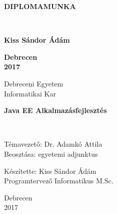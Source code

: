 \documentclass[hidelinks, 12pt, a4paper]{report}
\begin{document}
\begin{titlepage}
\pagestyle{empty}

\vspace*{4cm}

\begin{center}
\vfill
\begin{minipage}{\linewidth}
\centering
\begin{spacing}{2.5}
{ \huge \bfseries DIPLOMAMUNKA }
\end{spacing}
\end{minipage}
\\[10cm]

\begin{minipage}{1.0\textwidth}
\begin{flushright} \Large \bfseries
Kiss Sándor Ádám
\end{flushright}
\end{minipage}

\vfill

{\Large \bfseries Debrecen \\ 2017}

\end{center}
\end{titlepage}

\begin{titlepage}
\pagestyle{empty}
\begin{center}
Debreceni Egyetem \\
Informatikai Kar
\end{center}

\begin{center}
\vfill
\begin{minipage}{\linewidth}
\centering
\begin{spacing}{2.5}
{ \huge \bfseries Java EE Alkalmazásfejlesztés }
\end{spacing}
\end{minipage}
\\[7cm]
\begin{minipage}{0.45\textwidth}
\begin{flushleft} \large
Témavezető: Dr. Adamkó Attila\\
Beosztása: egyetemi adjunktus
\end{flushleft}
\end{minipage}
\begin{minipage}{0.5\textwidth}
\begin{flushright} \large
Készítette: Kiss Sándor Ádám\\
Programtervező Informatikus M.Sc.
\end{flushright}
\end{minipage}

\vfill

{\large Debrecen \\ 2017}

\end{center}
\end{titlepage}
\end{document}
